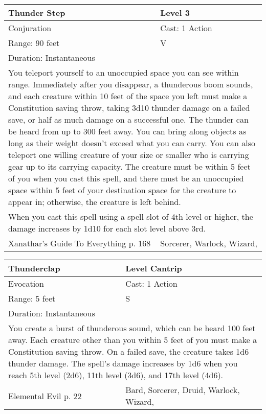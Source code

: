 \documentclass[11pt]{report}
\begin{document}
\begin{table}[H]
	\begin{tabular}{||p{6cm}|p{6cm}||}
		\hline\hline
		\bf{Thunder Step} & Level 3\\ \hline
		Conjuration & Cast: 1 Action\\ \hline
		Range: 90 feet & V\\ \hline
		Duration: Instantaneous & \\ \hline
		\multicolumn{2}{||p{12cm}||}{You teleport yourself to an unoccupied space you can see within range. Immediately after you disappear, a thunderous boom sounds, and each creature within 10 feet of the space you left must make a Constitution saving throw, taking 3d10 thunder damage on a failed save, or half as much damage on a successful one. The thunder can be heard from up to 300 feet away.
You can bring along objects as long as their weight doesn’t exceed what you can carry. You can also teleport one willing creature of your size or smaller who is carrying gear up to its carrying capacity. The creature must be within 5 feet of you when you cast this spell, and there must be an unoccupied space within 5 feet of your destination space for the creature to appear in; otherwise, the creature is left behind.}\\ \hline
		\multicolumn{2}{||p{12cm}||}{When you cast this spell using a spell slot of 4th level or higher, the damage increases by 1d10 for each slot level above 3rd.}\\ \hline
Xanathar's Guide To Everything p. 168 & Sorcerer, Warlock, Wizard, \\ \hline\hline
	\end{tabular}
\end{table}

\begin{table}[H]
	\begin{tabular}{||p{6cm}|p{6cm}||}
		\hline\hline
		\bf{Thunderclap} & Level Cantrip\\ \hline
		Evocation & Cast: 1 Action\\ \hline
		Range: 5 feet & S\\ \hline
		Duration: Instantaneous & \\ \hline
		\multicolumn{2}{||p{12cm}||}{You create a burst of thunderous sound, which can be heard 100 feet away. 
Each creature other than you within 5 feet of you must make a Constitution saving throw. On a failed save, the creature takes 1d6 thunder damage. 
The spell’s damage increases by 1d6 when you reach 5th level (2d6), 11th level (3d6), and 17th level (4d6).}\\ \hline
Elemental Evil p. 22 & Bard, Sorcerer, Druid, Warlock, Wizard, \\ \hline\hline
	\end{tabular}
\end{table}
\end{document}
